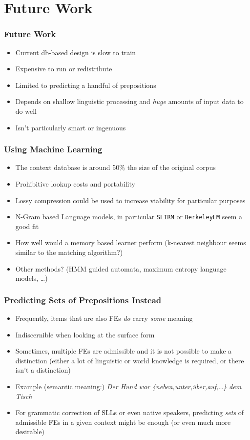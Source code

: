 \documentclass{beamer}
\begin{document}
\section{Future Work}
\begin{frame}
\frametitle{Future Work}
\begin{itemize}
\item Current db-based design is slow to train
\item Expensive to run or redistribute
\item Limited to predicting a handful of prepositions
\item Depends on shallow linguistic processing and {\em huge} amounts of input
data to do well
\item Isn't particularly smart or ingenuous
\end{itemize}
\end{frame}

\begin{frame}
\frametitle{Using Machine Learning}

\begin{itemize}
\item The context database is around 50\% the size of the original corpus
\item Prohibitive lookup costs and portability
\item Lossy compression could be used to increase viability for particular
purposes
\item N-Gram based Language models, in particular {\tt SLIRM} or {\tt BerkeleyLM}
seem a good fit
\item How well would a memory based learner perform (k-nearest neighbour seems
similar to the matching algorithm?)
\item Other methods? (HMM guided automata, maximum entropy language models, …)
\end{itemize}
\end{frame}

\begin{frame}
\frametitle{Predicting Sets of Prepositions Instead}

\begin{itemize}
\item Frequently, items that are also FEs {\em do} carry {\em some} meaning
\item Indiscernible when looking at the surface form
\item Sometimes, multiple FEs are admissible and it is not possible to make a
distinction (either a lot of linguistic or world knowledge is required, or there
isn't a distinction)
\item Example (semantic meaning:) {\it Der Hund war \{neben,unter,über,auf,\ldots\} dem Tisch}
\item For grammatic correction of SLLs or even native speakers, predicting {\em
sets} of admissible FEs in a given context might be enough (or even much more
desirable)
\end{itemize}
\end{frame}
\end{document}
